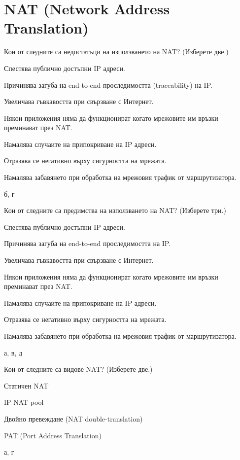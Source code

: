 \section{NAT (Network Address Translation)}

\begin{q}
  Кои от следните са недостатъци на използването на NAT? (Изберете две.)
  \begin{defractors}
  \item Спестява публично достъпни IP адреси.
  \item Причинява загуба на end-to-end проследимостта (traceability) на IP.
  \item Увеличава гъвкавостта при свързване с Интернет.
  \item Някои приложения няма да функционират когато мрежовите им връзки
    преминават през NAT.
  \item Намалява случаите на припокриване на IP адреси.
  \item Отразява се негативно върху сигурността на мрежата.
  \item Намалява забавянето при обработка на мрежовия трафик от маршрутизатора.
  \end{defractors}
  \rans б, г
\end{q}

\begin{q}
  Кои от следните са предимства на използването на NAT? (Изберете три.)
  \begin{defractors}
  \item Спестява публично достъпни IP адреси.
  \item Причинява загуба на end-to-end проследимостта на IP.
  \item Увеличава гъвкавостта при свързване с Интернет.
  \item Някои приложения няма да функционират когато мрежовите им връзки
    преминават през NAT.
  \item Намалява случаите на припокриване на IP адреси.
  \item Отразява се негативно върху сигурността на мрежата.
  \item Намалява забавянето при обработка на мрежовия трафик от маршрутизатора.
  \end{defractors}
  \rans а, в, д
\end{q}

\begin{q}
  Кои от следните са видове NAT? (Изберете две.)
  \begin{defractors}
  \item Статичен NAT
  \item IP NAT pool
  \item Двойно превеждане (NAT double-translation)
  \item PAT (Port Address Translation)
  \end{defractors}
  \rans а, г
\end{q}

